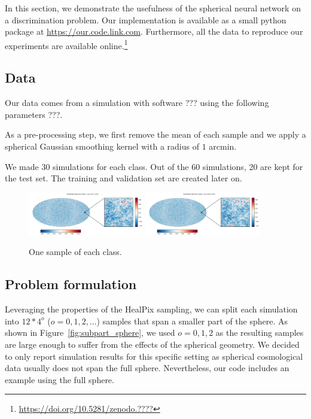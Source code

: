 \documentclass[final,twocolumn,3p,times,authoryear]{elsarticle}
\newcommand{\todo}[1]{{\color[rgb]{.6,.1,.6}{#1}}}
\newcommand{\assign}[1]{{\color[rgb]{.8,.5,.8}{Assigned: #1 }}}
\newcommand{\1}{\b{1}}              %
\newcommand{\0}{\b{0}}              %
\begin{document}
In this section, we demonstrate the usefulness of the spherical neural network
on a discrimination problem. Our implementation is available as a small python package at \url{https://our.code.link.com}. 
Furthermore, all the data to reproduce our experiments are available online.\footnote{\url{https://doi.org/10.5281/zenodo.????} \todo{correct DOI}}

\subsection{Data}
\assign{Tomek}

Our data comes from a simulation with software ??? using the following parameters ???. 

As a pre-processing step, we first remove the mean of each sample and we apply a
spherical Gaussian smoothing kernel with a radius of $1$ arcmin.

We made 30 simulations for each class. Out of the 60 simulations, 20 are kept
for the test set. The training and validation set are created later on.

\begin{figure}[!ht]
\centering
\includegraphics[width=0.45\textwidth]{figures/smooth_map_class_1.pdf}
\includegraphics[width=0.45\textwidth]{figures/smooth_map_class_2.pdf}
\caption{One sample of each class.}
\label{fig:map_sample}
\end{figure}

\subsection{Problem formulation}

Leveraging the properties of the HealPix sampling, we can split each simulation
into $12*4^o$ ($o=0,1,2,\dots$) samples that span a smaller part of the sphere.
As shown in Figure~\ref{fig:subpart_sphere}, we used $o=0,1,2$ as the resulting
samples are large enough to suffer from the effects of the spherical geometry. We
decided to only report simulation results for this specific setting as spherical
cosmological data usually does not span the full sphere. Nevertheless, our code
includes an example using the full sphere.
\end{document}
